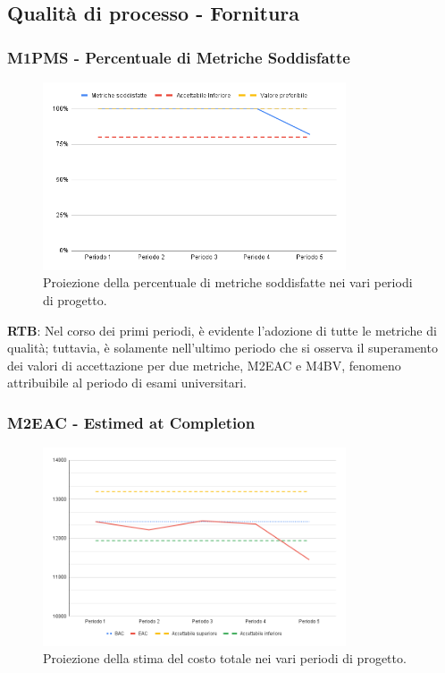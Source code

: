 \subsection{Qualità di processo - Fornitura}

\subsubsection{M1PMS - Percentuale di Metriche Soddisfatte}
\begin{figure}[H]
    \centering
    \includegraphics[width=0.8\textwidth]{../Images/PianoDiQualifica/M1PMS.png}
    \caption{Proiezione della percentuale di metriche soddisfatte nei vari periodi di progetto.}
    \label{fig:1}
\end{figure}
\textbf{RTB}: Nel corso dei primi periodi, è evidente l'adozione di tutte le metriche di qualità; tuttavia, è solamente nell'ultimo periodo che si osserva il superamento dei valori di accettazione per due metriche, M2EAC e M4BV, fenomeno attribuibile al periodo di esami universitari.

\subsubsection{M2EAC - Estimed at Completion}

\begin{figure}[H]
    \centering
    \includegraphics[width=0.8\textwidth]{../Images/PianoDiQualifica/M2EAC.png}
    \caption{Proiezione della stima del costo totale nei vari periodi di progetto.}
    \label{fig:2}
\end{figure}

